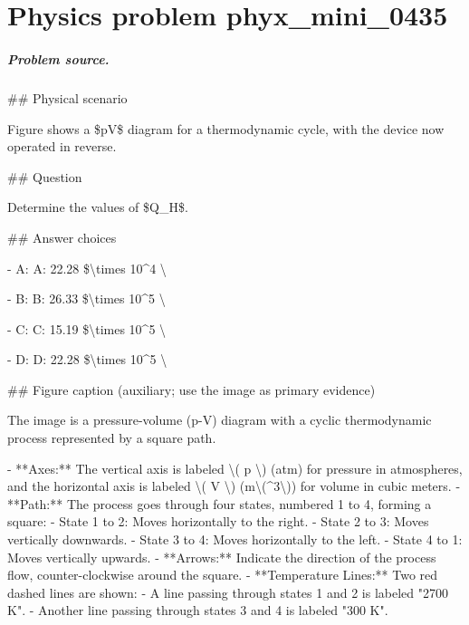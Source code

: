 
\chapter{Physics problem phyx\_mini\_0435}
\label{ch:PhyXMiniProblems_problem_phyx_mini_0435}

\paragraph{Problem source.}
\#\# Physical scenario

Figure shows a \$pV\$ diagram for a thermodynamic cycle, with the device now operated in reverse.

\#\# Question

Determine the values of \$Q\_H\$.

\#\# Answer choices

- A: A: 22.28 \$\textbackslash{}times 10\textasciicircum{}4 \textbackslash{}

- B: B: 26.33 \$\textbackslash{}times 10\textasciicircum{}5 \textbackslash{}

- C: C: 15.19 \$\textbackslash{}times 10\textasciicircum{}5 \textbackslash{}

- D: D: 22.28 \$\textbackslash{}times 10\textasciicircum{}5 \textbackslash{}

\#\# Figure caption (auxiliary; use the image as primary evidence)

The image is a pressure-volume (p-V) diagram with a cyclic thermodynamic process represented by a square path. 

- **Axes:** The vertical axis is labeled \textbackslash{}( p \textbackslash{}) (atm) for pressure in atmospheres, and the horizontal axis is labeled \textbackslash{}( V \textbackslash{}) (m\textbackslash{}(\textasciicircum{}3\textbackslash{})) for volume in cubic meters.
- **Path:** The process goes through four states, numbered 1 to 4, forming a square:
  - State 1 to 2: Moves horizontally to the right.
  - State 2 to 3: Moves vertically downwards.
  - State 3 to 4: Moves horizontally to the left.
  - State 4 to 1: Moves vertically upwards.
- **Arrows:** Indicate the direction of the process flow, counter-clockwise around the square.
- **Temperature Lines:** Two red dashed lines are shown:
  - A line passing through states 1 and 2 is labeled "2700 K".
  - Another line passing through states 3 and 4 is labeled "300 K".

